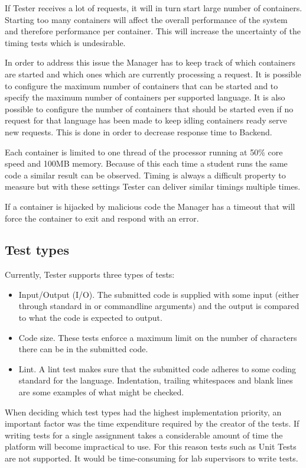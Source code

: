 If Tester receives a lot of requests, it will in turn start large number of containers.
Starting too many containers will affect the overall performance of the system and therefore performance per container.
This will increase the uncertainty of the timing tests which is undesirable.

In order to address this issue the Manager has to keep track of which containers
are started and which ones which are currently processing a request. 
It is possible to configure the maximum number of containers that
can be started and to specify the maximum number of containers
per supported language. It is also possible to configure the number of containers
that should be started even if no request for that language has been made to keep
idling containers ready serve new requests. This is done in order to decrease
response time to Backend.

Each container is limited to one thread of the processor running at 50\% core speed and
100MB memory. Because of this each time a student runs the same code a similar
result can be observed. Timing is always a difficult property to measure but with
these settings Tester can deliver similar timings multiple times.

If a container is hijacked by malicious code the Manager has a timeout that will
force the container to exit and respond with an error.

\subsection{Test types}
Currently, Tester supports three types of tests:
\begin{itemize}
\item Input/Output (I/O). The submitted code is supplied with some input (either through standard in or commandline arguments) and the output is compared to what the code is expected to output.
\item Code size. These tests enforce a maximum limit on the number of characters there can be in the submitted code.
\item Lint. A lint test makes sure that the submitted code adheres to some coding standard for the language. Indentation, trailing whitespaces and blank lines are some examples of what might be checked.
\end{itemize}

When deciding which test types had the highest implementation priority, an important factor was the time expenditure required by the creator of the tests. If writing tests for a single assignment takes a considerable amount of time the platform will become impractical to use. For this reason tests such as Unit Tests are not supported. It would be time-consuming for lab supervisors to write tests.

